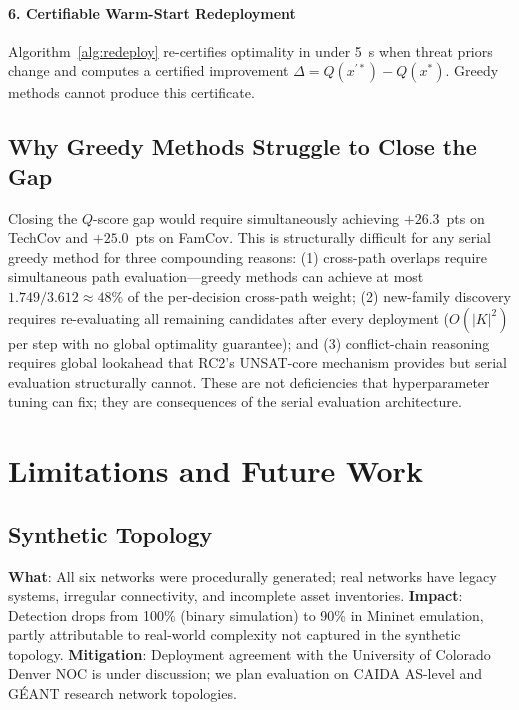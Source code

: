 \documentclass[journal]{IEEEtran}
\newcommand{\qscore}{$Q$-score}
\begin{document}
\paragraph{6. Certifiable Warm-Start Redeployment}
Algorithm~\ref{alg:redeploy} re-certifies optimality in under 5~s
when threat priors change and computes a certified improvement
$\Delta=Q(x^{\prime*})-Q(x^*)$. Greedy methods cannot produce this
certificate.

\subsection{Why Greedy Methods Struggle to Close the Gap}
Closing the \qscore{} gap would require simultaneously achieving
$+26.3$~pts on TechCov and $+25.0$~pts on FamCov. This is
structurally difficult for any serial greedy method for three
compounding reasons: (1) cross-path overlaps require simultaneous
path evaluation---greedy methods can achieve at most
$1.749/3.612\approx48\%$ of the per-decision cross-path weight;
(2) new-family discovery requires re-evaluating all remaining
candidates after every deployment ($O(|K|^2)$ per step with no
global optimality guarantee); and (3) conflict-chain reasoning
requires global lookahead that RC2's UNSAT-core mechanism provides
but serial evaluation structurally cannot. These are not deficiencies
that hyperparameter tuning can fix; they are consequences of the
serial evaluation architecture.

\FloatBarrier
\section{Limitations and Future Work}
\label{sec:limitations}

\subsection{Synthetic Topology}
\label{sec:limitations:topology}
\textbf{What}: All six networks were procedurally generated; real
networks have legacy systems, irregular connectivity, and incomplete
asset inventories.
\textbf{Impact}: Detection drops from 100\% (binary simulation) to
90\% in Mininet emulation, partly attributable to real-world
complexity not captured in the synthetic topology.
\textbf{Mitigation}: Deployment agreement with the University of
Colorado Denver NOC is under discussion; we plan evaluation on
CAIDA AS-level and G\'EANT research network topologies.
\end{document}
